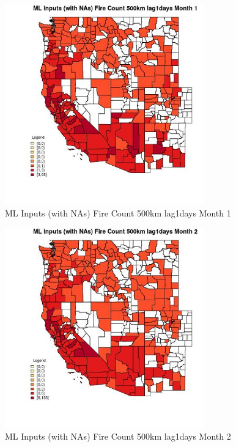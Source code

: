 \begin{figure} 
\centering  
\includegraphics[width=0.77\textwidth]{Code_Outputs/Report_ML_input_PM25_Step4_part_e_de_duplicated_aves_compiled_2019-05-21wNAs_CountyFire_Count_500km_lag1daysmedianMonth1.jpg} 
\caption{\label{fig:Report_ML_input_PM25_Step4_part_e_de_duplicated_aves_compiled_2019-05-21wNAsCountyFire_Count_500km_lag1daysmedianMonth1}ML Inputs (with NAs) Fire Count 500km lag1days Month 1} 
\end{figure} 
 

\begin{figure} 
\centering  
\includegraphics[width=0.77\textwidth]{Code_Outputs/Report_ML_input_PM25_Step4_part_e_de_duplicated_aves_compiled_2019-05-21wNAs_CountyFire_Count_500km_lag1daysmedianMonth2.jpg} 
\caption{\label{fig:Report_ML_input_PM25_Step4_part_e_de_duplicated_aves_compiled_2019-05-21wNAsCountyFire_Count_500km_lag1daysmedianMonth2}ML Inputs (with NAs) Fire Count 500km lag1days Month 2} 
\end{figure} 
 

